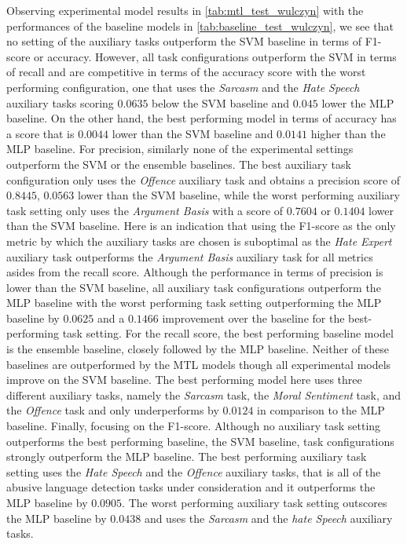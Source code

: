 Observing experimental model results in \cref{tab:mtl_test_wulczyn} with the performances of the baseline models in \cref{tab:baseline_test_wulczyn}, we see that no setting of the auxiliary tasks outperform the SVM baseline in terms of F1-score or accuracy.
However, all task configurations outperform the SVM in terms of recall and are competitive in terms of the accuracy score with the worst performing configuration, one that uses the \textit{Sarcasm} and the \textit{Hate Speech} auxiliary tasks scoring $0.0635$ below the SVM baseline and $0.045$ lower the MLP baseline.
On the other hand, the best performing model in terms of accuracy has a score that is $0.0044$ lower than the SVM baseline and $0.0141$ higher than the MLP baseline.
For precision, similarly none of the experimental settings outperform the SVM or the ensemble baselines.
The best auxiliary task configuration only uses the \textit{Offence} auxiliary task and obtains a precision score of $0.8445$, $0.0563$ lower than the SVM baseline, while the worst performing auxiliary task setting only uses the \textit{Argument Basis} with a score of $0.7604$ or $0.1404$ lower than the SVM baseline.
Here is an indication that using the F1-score as the only metric by which the auxiliary tasks are chosen is suboptimal as the \textit{Hate Expert} auxiliary task outperforms the \textit{Argument Basis} auxiliary task for all metrics asides from the recall score.
Although the performance in terms of precision is lower than the SVM baseline, all auxiliary task configurations outperform the MLP baseline with the worst performing task setting outperforming the MLP baseline by $0.0625$ and a $0.1466$ improvement over the baseline for the best-performing task setting.
For the recall score, the best performing baseline model is the ensemble baseline, closely followed by the MLP baseline.
Neither of these baselines are outperformed by the MTL models though all experimental models improve on the SVM baseline.
The best performing model here uses three different auxiliary tasks, namely the \textit{Sarcasm} task, the \textit{Moral Sentiment} task, and the \textit{Offence} task and only underperforms by $0.0124$ in comparison to the MLP baseline.
Finally, focusing on the F1-score.
Although no auxiliary task setting outperforms the best performing baseline, the SVM baseline, task configurations strongly outperform the MLP baseline.
The best performing auxiliary task setting uses the \textit{Hate Speech} and the \textit{Offence} auxiliary tasks, that is all of the abusive language detection tasks under consideration and it outperforms the MLP baseline by $0.0905$.
The worst performing auxiliary task setting outscores the MLP baseline by $0.0438$ and uses the \textit{Sarcasm} and the \textit{hate Speech} auxiliary tasks.

